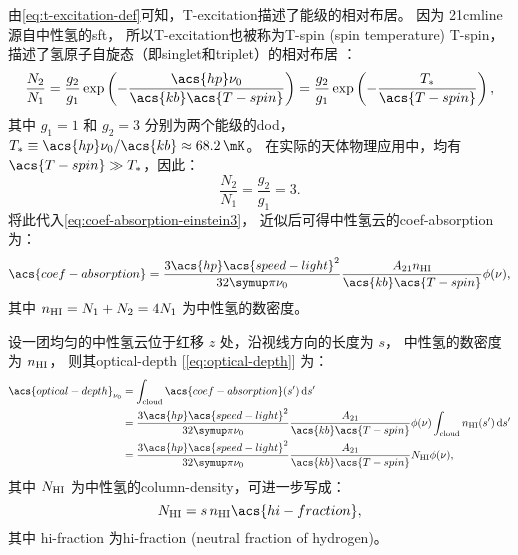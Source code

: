 由\autoref{eq:t-excitation-def}可知，\acl{T-excitation}描述了能级的相对布居。
因为 \ac{21cmline}源自中性氢的\ac{sft}，
所以\acl{T-excitation}也被称为\acl{T-spin} (spin temperature) \ac{T-spin}，
描述了氢原子自旋态（即\ac{singlet}和\ac{triplet}）的相对布居 \cite{field1958}：
\begin{equation}
  \frac{N_2}{N_1} = \frac{g_2}{g_1}
    \exp\left( -\frac{\acs{hp} \nu_0}{\acs{kb} \acs{T-spin}} \right)
    = \frac{g_2}{g_1} \exp\left( -\frac{T_*}{\acs{T-spin}} \right),
\end{equation}
其中
$g_1 = 1$ 和 $g_2 = 3$ 分别为两个能级的\ac{dod}，
$T_* \equiv \acs{hp} \nu_0 / \acs{kb} \approx \SI{68.2}{\mK}$。
在实际的天体物理应用中，均有 $\acs{T-spin} \gg T_*$，因此：
\begin{equation}
  \frac{N_2}{N_1} = \frac{g_2}{g_1} = 3 .
\end{equation}
将此代入\autoref{eq:coef-absorption-einstein3}，
近似后可得中性氢云的\acl{coef-absorption}为：
\begin{equation}
  \acs{coef-absorption}
    = \frac{3 \acs{hp} \acs{speed-light}^2}{32\Cpi \nu_0}
      \frac{A_{21} n_{\R{HI}}}{\acs{kb} \acs{T-spin}} \phi(\nu) ,
\end{equation}
其中 $n_{\mathrm{HI}} = N_1 + N_2 = 4 N_1$ 为中性氢的数密度。

设一团均匀的中性氢云位于红移 $z$ 处，沿视线方向的长度为 $s$，
中性氢的数密度为 $n_{\mathrm{HI}}$，
则其\acl{optical-depth} [\autoref{eq:optical-depth}] 为：
\begin{align}
  \acs{optical-depth}_{\nu_0}
    & = \int_{\R{cloud}} \acs{coef-absorption}(s') \,\D{s'}  \\
    & = \frac{3 \acs{hp} \acs{speed-light}^2}{32\Cpi \nu_0}
      \frac{A_{21}}{\acs{kb} \acs{T-spin}} \phi(\nu)
      \int_{\R{cloud}} n_{\R{HI}}(s') \,\D{s'}  \\
    & = \frac{3 \acs{hp} \acs{speed-light}^2}{32\Cpi \nu_0}
      \frac{A_{21}}{\acs{kb} \acs{T-spin}} N_{\R{HI}} \phi(\nu) ,
  \label{eq:21cm-optical-depth1}
\end{align}
其中 $N_{\mathrm{HI}}$ 为中性氢的\ac{column-density}，可进一步写成：
\begin{equation}
  \label{eq:column-density}
  N_{\R{HI}} = s \, n_{\R{HI}} \acs{hi-fraction} ,
\end{equation}
其中 \acs{hi-fraction} 为\acl{hi-fraction} (neutral fraction of hydrogen)。

